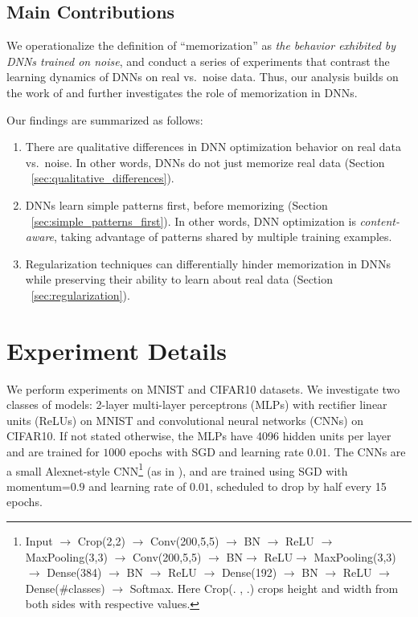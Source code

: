 \documentclass{article}
\begin{document}
\subsection*{Main Contributions}
 We operationalize the definition of ``memorization'' as {\it the behavior exhibited by DNNs trained on noise}, and conduct a series of experiments that contrast the learning dynamics of DNNs on real vs.~noise data.
 Thus, our analysis builds on the work of \citet{understanding_DL} and further investigates the role of memorization in DNNs. 

Our findings are summarized as follows:
\begin{enumerate}
\item There are qualitative differences in DNN optimization behavior on real data vs.~noise.
In other words, DNNs do not just memorize real data (Section ~\ref{sec:qualitative_differences}).
\item DNNs learn simple patterns first, before memorizing (Section ~\ref{sec:simple_patterns_first}).
In other words, DNN optimization is {\it content-aware}, taking advantage of patterns shared by multiple training examples.
\item Regularization techniques can differentially hinder memorization in DNNs while preserving their ability to learn about real data (Section ~\ref{sec:regularization}). 
\end{enumerate}












\section{Experiment Details}

We perform experiments on MNIST \citep{lecun1998mnist} and CIFAR10 \citep{CIFAR10} datasets.
We investigate two classes of models: 2-layer multi-layer perceptrons (MLPs) with rectifier linear units (ReLUs) on MNIST and convolutional neural networks (CNNs) on CIFAR10.
If not stated otherwise, the MLPs have 4096 hidden units per layer and are trained for $1000$ epochs with SGD and learning rate $0.01$. 
The CNNs are a small Alexnet-style CNN\footnote{Input $\rightarrow$ Crop(2,2) $\rightarrow$ Conv(200,5,5) $\rightarrow$ BN $\rightarrow$ ReLU $\rightarrow$ MaxPooling(3,3) $\rightarrow$ Conv(200,5,5) $\rightarrow$ BN$\rightarrow$ ReLU$\rightarrow$ MaxPooling(3,3) $\rightarrow$ Dense(384) $\rightarrow$ BN $\rightarrow$ ReLU $\rightarrow$ Dense(192) $\rightarrow$ BN $\rightarrow$ ReLU $\rightarrow$ Dense($\#$classes) $\rightarrow$ Softmax. Here Crop(. , .) crops height and width from both sides with respective values. } (as in \citet{understanding_DL}), and are trained using SGD with momentum=$0.9$ and learning rate of $0.01$, scheduled to drop by half every 15 epochs.
\end{document}
